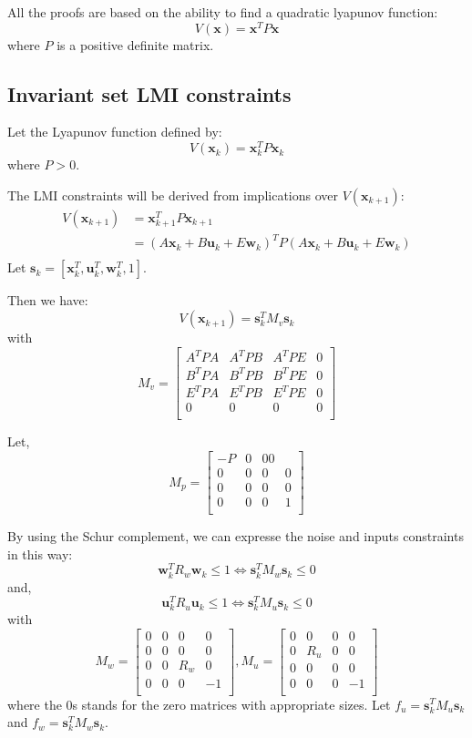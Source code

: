 \documentclass{article}
\theoremstyle{named}
\newcommand{\vect}[1]{\ensuremath{ \mathbf{#1}}}
\begin{document}
All the proofs are based on the ability to find a quadratic lyapunov function:
$$
V(\vect{x}) = \vect{x}^T P \vect{x}
$$
where $P$ is a positive definite matrix.

\subsection{Invariant set LMI constraints}
\newcommand{\xk}{\vect{x}_k}
\newcommand{\uk}{\vect{u}_k}
\newcommand{\wk}{\vect{w}_k}
\newcommand{\sk}{\vect{s}_k}
\newcommand{\xkn}{\vect{x}_{k+1}}

Let the Lyapunov function defined by:
$$
V(\xk) = \xk^T P \xk
$$
where $P>0$.

The LMI constraints will be derived from implications over $V(\xkn)$:
\begin{align*}
V(\xkn) &= \xkn^T P \xkn\\
  &= (A \xk + B \uk + E \wk)^T P (A \xk + B \uk + E \wk)\\
\end{align*}
Let $\sk = \left[ \xk^T, \uk^T, \wk^T, 1 \right]$.

Then we have:
$$
V(\xkn) = \sk^T M_v \sk
$$
with
$$
M_v =
\begin{bmatrix}
A^T P A & A^T P B & A^T P E & 0 \\
B^T P A & B^T P B & B^T P E & 0 \\
E^T P A & E^T P B & E^T P E & 0 \\
0       & 0       & 0       & 0 \\
\end{bmatrix}
$$

Let,
$$
M_p = \begin{bmatrix}
-P&0&00\\
0&0&0&0\\
0&0&0&0\\
0&0&0&1\\
\end{bmatrix}
$$

By using the Schur complement, we can expresse the noise and inputs constraints in this way:
$$
\wk^T R_w \wk \leq 1
\Leftrightarrow
\sk^T M_w \sk \leq 0
$$
and,
$$
\uk^T R_u \uk \leq 1
\Leftrightarrow
\sk^T M_u \sk \leq 0
$$
with
$$
M_w = \begin{bmatrix}
0&0&0&0\\
0&0&0&0\\
0&0&R_w&0\\
0&0&0&-1\\
\end{bmatrix},
M_u = \begin{bmatrix}
0&0&0&0\\
0&R_u&0&0\\
0&0&0&0\\
0&0&0&-1\\
\end{bmatrix}
$$
where the $0$s stands for the zero matrices with appropriate sizes.
Let $f_u = \sk^T M_u \sk$ and $f_w = \sk^T M_w \sk$.
\end{document}

